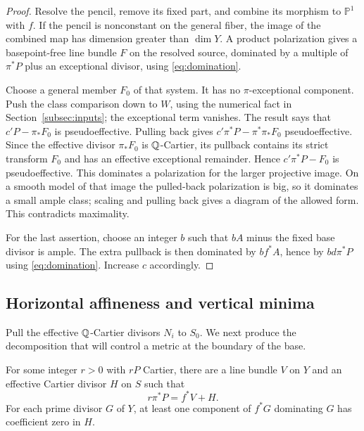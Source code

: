 \begin{proof}
Resolve the pencil, remove its fixed part, and combine its morphism to $\mathbb P^1$ with $f$. If the pencil is nonconstant on the general fiber, the image of the combined map has dimension greater than $\dim Y$. A product polarization gives a basepoint-free line bundle $F$ on the resolved source, dominated by a multiple of $\pi^*P$ plus an exceptional divisor, using \eqref{eq:domination}.

Choose a general member $F_0$ of that system. It has no $\pi$-exceptional component. Push the class comparison down to $W$, using the numerical fact in Section~\ref{subsec:inputs}; the exceptional term vanishes. The result says that $c'P-\pi_*F_0$ is pseudoeffective. Pulling back gives $c'\pi^*P-\pi^*\pi_*F_0$ pseudoeffective. Since the effective divisor $\pi_*F_0$ is $\mathbb Q$-Cartier, its pullback contains its strict transform $F_0$ and has an effective exceptional remainder. Hence $c'\pi^*P-F_0$ is pseudoeffective. This dominates a polarization for the larger projective image. On a smooth model of that image the pulled-back polarization is big, so it dominates a small ample class; scaling and pulling back gives a diagram of the allowed form. This contradicts maximality.

For the last assertion, choose an integer $b$ such that $bA$ minus the fixed base divisor is ample. The extra pullback is then dominated by $bf^*A$, hence by $bd\pi^*P$ using \eqref{eq:domination}. Increase $c$ accordingly.
\end{proof}

\subsection{Horizontal affineness and vertical minima}\label{subsec:minima}

Pull the effective $\mathbb Q$-Cartier divisors $N_i$ to $S_0$. We next produce the decomposition that will control a metric at the boundary of the base.

\begin{lemma}\label{lem:decomposition}
For some integer $r>0$ with $rP$ Cartier, there are a line bundle $V$ on $Y$ and an effective Cartier divisor $H$ on $S$ such that
\begin{equation}\label{eq:decomposition}
r\pi^*P=f^*V+H.
\end{equation}
For each prime divisor $G$ of $Y$, at least one component of $f^*G$ dominating $G$ has coefficient zero in $H$.
\end{lemma}


